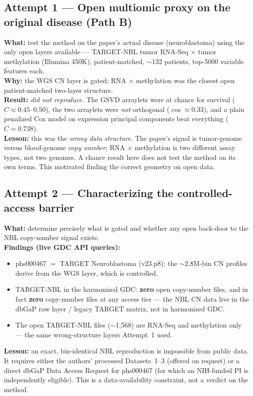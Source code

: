 \documentclass[11pt]{article}
\newcommand{\C}{\textit{C}}
\begin{document}
\subsection{Attempt 1 --- Open multiomic proxy on the original disease (Path B)}
\textbf{What:} test the method on the paper's actual disease (neuroblastoma) using
the only open layers available --- TARGET-NBL tumor RNA-Seq $\times$ tumor
methylation (Illumina 450K), patient-matched, $\sim$132 patients, top-5000
variable features each.\\
\textbf{Why:} the WGS CN layer is gated; RNA $\times$ methylation was the closest
open patient-matched two-layer structure.\\
\textbf{Result:} \emph{did not reproduce.} The GSVD arraylets were at chance for
survival ($\C\approx0.45$--$0.50$), the two arraylets were \emph{not} orthogonal
($\cos\approx0.33$), and a plain penalized Cox model on expression principal
components beat everything ($\C=0.738$).\\
\textbf{Lesson:} this was the \emph{wrong data structure}. The paper's signal is
tumor-genome versus blood-genome \emph{copy number}; RNA $\times$ methylation is
two different assay types, not two genomes. A chance result here does not test the
method on its own terms. This motivated finding the correct geometry on open data.

\subsection{Attempt 2 --- Characterizing the controlled-access barrier}
\textbf{What:} determine precisely what is gated and whether any open back-door to
the NBL copy-number signal exists.\\
\textbf{Findings (live GDC API queries):}
\begin{itemize}[leftmargin=1.4em,nosep]
  \item phs000467 $=$ TARGET Neuroblastoma (v23.p8); the $\sim$2.8M-bin CN profiles
  derive from the WGS layer, which is controlled.
  \item TARGET-NBL in the harmonized GDC: \textbf{zero} open copy-number files,
  and in fact \textbf{zero} copy-number files at any access tier --- the NBL CN
  data live in the dbGaP raw layer / legacy TARGET matrix, not in harmonized GDC.
  \item The open TARGET-NBL files ($\sim$1{,}568) are RNA-Seq and methylation only
  --- the same wrong-structure layers Attempt~1 used.
\end{itemize}
\textbf{Lesson:} an exact, bin-identical NBL reproduction is impossible from
public data. It requires either the authors' processed Datasets~1--3 (offered on
request) or a direct dbGaP Data Access Request for phs000467 (for which an
NIH-funded PI is independently eligible). This is a data-availability constraint,
not a verdict on the method.
\end{document}
